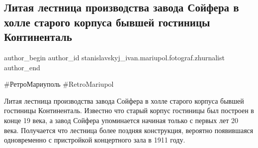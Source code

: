  
 
 
 
 

\subsection{Литая лестница производства завода Сойфера в холле старого корпуса бывшей гостиницы Континенталь}
\label{sec:23_10_2020.fb.stanislavskyj_ivan.mariupol.fotograf.zhurnalist.1.litaja_lestnica_zavod_sojfer}

\ifcmt
 author_begin
   author_id stanislavskyj_ivan.mariupol.fotograf.zhurnalist
 author_end
\fi

\#РетроМариуполь \#RetroMariupol

Литая лестница производства завода Сойфера в холле старого корпуса бывшей
гостиницы Континенталь. Известно что старый корпус гостиницы был построен в
конце 19 века, а завод Сойфера упоминается начиная только с первых лет 20 века.
Получается что лестница более поздняя конструкция, вероятно появившаяся
одновременно с пристройкой концертного зала в 1911 году.

